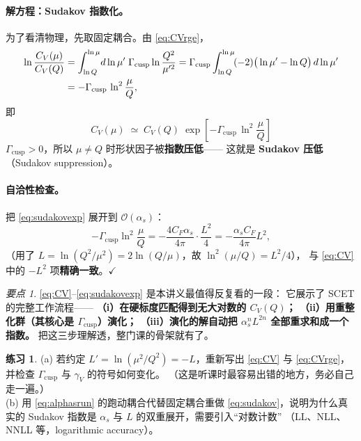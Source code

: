 \documentclass[UTF8,a4paper,11pt]{ctexart}
\theoremstyle{definition}
\newtheorem{exercise}{练习}[section]
\theoremstyle{remark}
\newtheorem{keypoint}{要点}[section]
\theoremstyle{plain}
\newcommand{\as}{\alpha_s}
\newcommand{\CF}{C_F}
\newcommand{\Gcusp}{\Gamma_{\mathrm{cusp}}}
\newcommand{\en}[1]{\textsf{#1}}   %
\begin{document}
\paragraph{解方程：Sudakov 指数化。}
为了看清物理，先取固定耦合。由 \eqref{eq:CVrge}，
\begin{align}
  \ln\frac{C_V(\mu)}{C_V(Q)}
  &=\int_{\ln Q}^{\ln\mu}\! d\ln\mu'\;\Gcusp\ln\frac{Q^2}{\mu'^2}
   =\Gcusp\int_{\ln Q}^{\ln\mu}\!(-2)\big(\ln\mu'-\ln Q\big)\,d\ln\mu'
   \notag\\
  &=-\Gcusp\,\ln^2\frac{\mu}{Q} ,
  \label{eq:sudakov}
\end{align}
即
\begin{equation}
  \boxed{\;
  C_V(\mu)\;\simeq\;C_V(Q)\;
  \exp\!\left[-\Gcusp\,\ln^2\frac{\mu}{Q}\right]\;}
  \label{eq:sudakovexp}
\end{equation}
$\Gcusp>0$，所以 $\mu\ne Q$ 时形状因子被\textbf{指数压低}——
这就是 \textbf{Sudakov 压低}（\en{Sudakov suppression}）。

\paragraph{自洽性检查。}把 \eqref{eq:sudakovexp} 展开到 $\mathcal O(\as)$：
\begin{equation}
  -\Gcusp\ln^2\frac{\mu}{Q}
  =-\frac{4\CF\as}{4\pi}\cdot\frac{L^2}{4}
  =-\frac{\as\CF}{4\pi}L^2 ,
\end{equation}
（用了 $L=\ln(Q^2/\mu^2)=2\ln(Q/\mu)$，故 $\ln^2(\mu/Q)=L^2/4$），
与 \eqref{eq:CV} 中的 $-L^2$ 项\textbf{精确一致}。$\checkmark$

\begin{keypoint}
\eqref{eq:CV}--\eqref{eq:sudakovexp} 是本讲义最值得反复看的一段：
它展示了 SCET 的完整工作流程——
\textbf{（i）在硬标度匹配得到无大对数的 $C_V(Q)$；
（ii）用重整化群（其核心是 $\Gcusp$）演化；
（iii）演化的解自动把 $\as^nL^{2n}$ 全部重求和成一个指数。}
把这三步理解透，整门课的骨架就有了。
\end{keypoint}

\begin{exercise}
(a) 若约定 $L'=\ln(\mu^2/Q^2)=-L$，重新写出 \eqref{eq:CV} 与
\eqref{eq:CVrge}，并检查 $\Gcusp$ 与 $\gamma_V$ 的符号如何变化。
（这是听课时最容易出错的地方，务必自己走一遍。）\\
(b) 用 \eqref{eq:alphasrun} 的跑动耦合代替固定耦合重做
\eqref{eq:sudakov}，说明为什么真实的 Sudakov 指数是
$\as$ 与 $L$ 的双重展开，需要引入“对数计数”
（LL、NLL、NNLL 等，\en{logarithmic accuracy}）。
\end{exercise}
\end{document}
